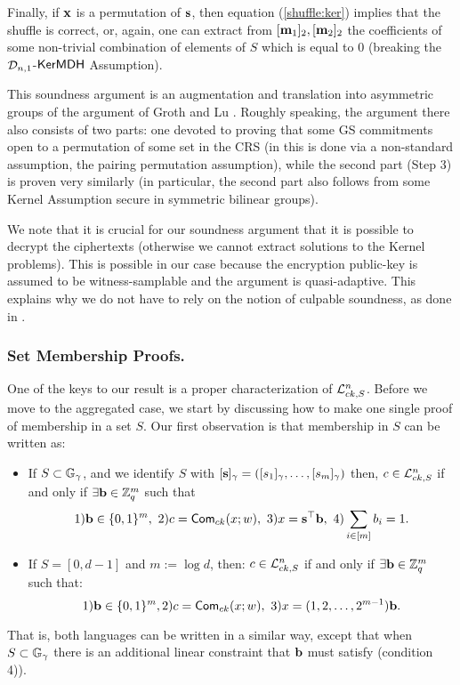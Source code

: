 Finally, if $\mathbf{x}$ is a permutation of $\mathbf{s}$,  then equation (\ref{shuffle:ker}) implies that the shuffle is correct, or, again, 
one can extract from   $[\mathbf{m}_1]_2,[\mathbf{m}_2]_2$ the coefficients of some non-trivial combination of elements of $S$ which is equal to $0$ (breaking the $\mathcal{D}_{n,1}$-$\mathsf{KerMDH}$ Assumption). 

This soundness argument is an augmentation and translation into asymmetric groups of the argument of Groth and Lu \cite{AC:GroLu07}. Roughly speaking, the argument there also consists of two parts: one devoted to proving that some GS commitments open to a permutation of some set in the CRS (in \cite{AC:GroLu07} this is done via a non-standard assumption, the pairing permutation assumption), while the second part (Step 3) is proven very similarly (in particular, the second part also follows from some Kernel Assumption secure in symmetric bilinear groups). 

We note that it is crucial for our soundness argument that it is possible to decrypt the ciphertexts (otherwise we cannot extract solutions to the Kernel problems). This is possible in our case because the encryption public-key is assumed to be witness-samplable and the argument is quasi-adaptive. This explains why we do not have to rely on the notion of culpable soundness, as done in \cite{AC:GroLu07,EPRINT:FauLip15}.


\subsubsection{Set Membership Proofs.} One of the keys to our result is a proper characterization of  $\mathcal{L}^{n}_{ck,S}$. Before we move to the aggregated case, we start by discussing how to make one single proof of membership in a set $S$. Our first observation is that  
 membership in $S$ can be written as:
\begin{itemize}
\item If $S \subset \mathbb{G}_{\gamma}$, and we identify $S$ with $[\mathbf{s}]_\gamma=([s_1]_\gamma,\ldots,[s_m]_\gamma)$ then, 
$c \in \mathcal{L}^{n}_{ck,S}$ if and only if $\exists \mathbf{b} \in \mathbb{Z}_q^{m}$ such that
\vspace{-0.4cm}
$$ 1) \mathbf{b} \in \{0,1\}^{m}, \ 2) c=\mathsf{Com}_{ck}(x;w), \ 3) x=\mathbf{s}^{\top} \mathbf{b}, \ 4) \sum_{i \in [m]} b_i=1.$$
\vspace{-0.2cm}
\item If $S=[0,d-1]$ and $m:=\log d$, then: 
$c \in \mathcal{L}^{n}_{ck,S}$ if and only if $\exists \mathbf{b} \in \mathbb{Z}_q^{m}$ such that:   
\vspace{-0.2cm}
$$ 1) \mathbf{b} \in \{0,1\}^{m}, 2) c=\mathsf{Com}_{ck}(x;w), \ 3) x=(1,2,\ldots,2^{m-1}) \mathbf{b} .$$
\end{itemize} 
\vspace{-0.2cm}
That is, both languages can be written in a similar way, except that when $S \subset \mathbb{G}_{\gamma}$ there is an additional linear constraint that $\mathbf{b}$ must satisfy (condition 4)). 

